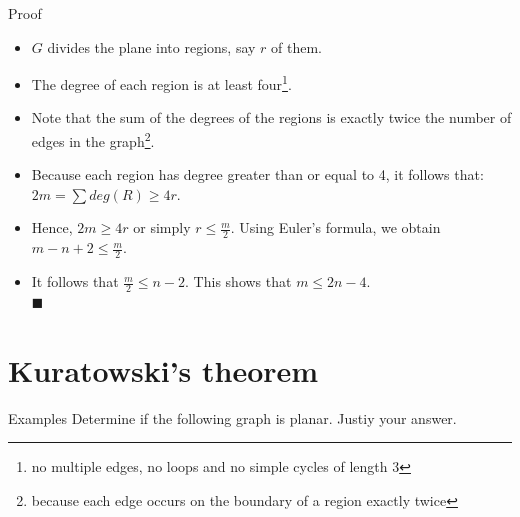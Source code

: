 \documentclass{beamer}
\theoremstyle{definition}
\begin{document}
\begin{frame}{Proof}
    \begin{itemize}[<+->]
        \item $G$ divides the plane into regions, say $r$ of them.
        \item The degree of each region is at least four\footnote{{\tiny no multiple edges, no loops and no simple cycles of length 3}}.
        \item Note that the sum of the degrees of the regions is exactly twice the number of edges in the graph\footnote{{\tiny because each edge occurs on the boundary of a region exactly twice}}.
        \item Because each region has degree greater than or equal to 4, it follows that: $ 2m = \sum deg(R) \geq 4r $.
        \item Hence, $2m \geq 4r$ or simply $r \leq \frac{m}{2}$. Using Euler's formula, we obtain $m - n + 2 \leq \frac{m}{2}$.
        \item It follows that $\frac{m}{2} \leq n - 2$. This shows that $m \leq 2n - 4$. \\ \hspace{10.5cm} {\tiny $\blacksquare$}
    \end{itemize}
\end{frame}

\section{Kuratowski's theorem}

\begin{frame}{Examples}
    Determine if the following graph is planar.  Justiy your answer.
    \centering
    \begin{figure}
    \end{figure}
\end{frame}
\end{document}
